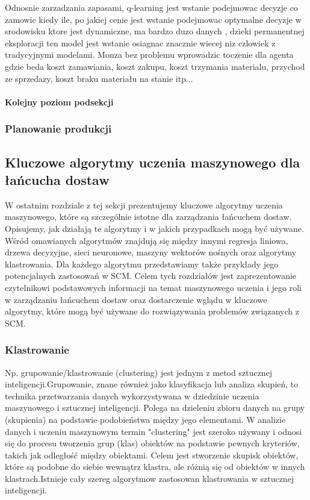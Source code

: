 Odnosnie zarzadzania zapasami, q-learning jest wstanie podejmowac decyzje co zamowic kiedy ile, po jakiej cenie jest wstanie podejmowac optymalne decyzje w srodowisku ktore jest dynamiczne, ma bardzo duzo danych , dzieki permanentnej eksploracji ten model jest wstanie osiagnac znacznie wiecej niz czlowiek z tradycyjnymi modelami. Monza bez problemu wprowadzic toczenie dla agenta gdzie beda koszt zamawiania, koszt zakupu, koszt trzymania materialu, przychod ze sprzedazy, koszt braku materiału na stanie itp...

\cite{Had2023}\cite{wiksvr2023}\cite{alakh2023}\cite{intell2023}



\paragraph{Kolejny poziom podsekcji}

\newpage
\subsubsection{Planowanie produkcji}

\newpage
\par
\subsection{Kluczowe algorytmy uczenia maszynowego dla łańcucha dostaw}
    W ostatnim rozdziale z tej sekcji prezentujemy kluczowe algorytmy uczenia maszynowego, które są szczególnie istotne dla zarządzania łańcuchem dostaw. Opisujemy, jak działają te algorytmy i w jakich przypadkach mogą być używane. Wśród omawianych algorytmów znajdują się między innymi regresja liniowa, drzewa decyzyjne, sieci neuronowe, maszyny wektorów nośnych oraz algorytmy klastrowania. Dla każdego algorytmu przedstawiamy także przykłady jego potencjalnych zastosowań w SCM.
Celem tych rozdziałów jest zaprezentowanie czytelnikowi podstawowych informacji na temat maszynowego uczenia i jego roli w zarządzaniu łańcuchem dostaw oraz dostarczenie wglądu w kluczowe algorytmy, które mogą być używane do rozwiązywania problemów związanych z SCM.




\subsubsection{Klastrowanie}

 Np. grupowanie/klastrowanie (clustering) jest jednym z metod sztucznej inteligencji.Grupowanie, znane również jako klasyfikacja lub analiza skupień, to technika przetwarzania danych wykorzystywana w dziedzinie uczenia maszynowego i sztucznej inteligencji. Polega na dzieleniu zbioru danych na grupy (skupienia) na podstawie podobieństwa między jego elementami. W analizie danych i uczeniu maszynowym termin "clustering" jest szeroko używany i odnosi się do procesu tworzenia grup (klas) obiektów na podstawie pewnych kryteriów, takich jak odległość między obiektami. Celem jest stworzenie skupisk obiektów, które są podobne do siebie wewnątrz klastra, ale różnią się od obiektów w innych klastrach.Istnieje cały szereg algorytmow zastosowan klastrowania w sztucznej inteligencji.

